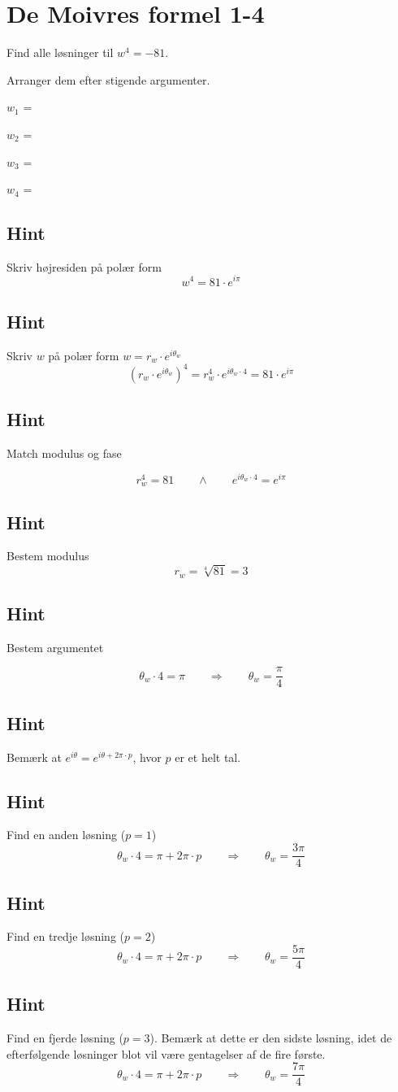 \documentclass{article}
\newenvironment{exercise}[1]{\newpage\section{#1}}{}
\newcommand{\answerbox}[1]{\fbox{$#1$}}
\newcommand{\hint}{\subsection*{Hint}}
\begin{document}
\begin{exercise}{De Moivres formel 1-4}

Find alle løsninger til $w^4=-81$. 

Arranger dem efter stigende argumenter.

$w_1$ = \answerbox{3 \cdot e^{i \frac{\pi}{4}}}		

$w_2$ = \answerbox{3 \cdot e^{i \frac{3 \pi}{4}}}		

$w_3$ = \answerbox{3 \cdot e^{i \frac{5 \pi}{4}}}		

$w_4$ = \answerbox{3 \cdot e^{i \frac{7 \pi}{4}}}	 


\hint 

Skriv højresiden på polær form
\[
w^4 = 81 \cdot e^{i \pi}
\]


\hint

Skriv $w$ på polær form $w = r_w \cdot e^{i \theta_w}$
\[
\left(r_w \cdot e^{i \theta_w}\right)^4 = r_w^4 \cdot e^{i \theta_w \cdot 4} = 81 \cdot e^{i \pi}
\]

\hint 
Match modulus og fase

\[
r_w^4 = 81 \qquad \wedge \qquad e^{i \theta_w \cdot 4} = e^{i \pi}
\]

\hint

Bestem modulus
\[
r_w  =  \sqrt[4]{81} = 3
\]

\hint

Bestem argumentet

\[
\theta_w \cdot 4 = \pi \qquad \Rightarrow \qquad  \theta_w = \frac{\pi}{4}
\]

\hint

Bemærk at $e^{i \theta} = e^{i \theta + 2 \pi \cdot p}$, hvor $p$ er et helt tal.

\hint

Find en anden løsning ($p=1$)
\[
\theta_w \cdot 4 = \pi  + 2 \pi \cdot p \qquad \Rightarrow \qquad  \theta_w = \frac{3 \pi}{4}
\]

\hint

Find en tredje løsning ($p=2$)
\[
\theta_w \cdot 4 = \pi  + 2 \pi \cdot p \qquad \Rightarrow  \qquad  \theta_w = \frac{5 \pi}{4}
\]

\hint

Find en fjerde løsning ($p=3$). 
Bemærk at dette er den sidste løsning, idet de efterfølgende 
løsninger blot vil være gentagelser af de fire første. 
\[
\theta_w \cdot 4 = \pi  + 2 \pi \cdot p \qquad \Rightarrow  \qquad  \theta_w = \frac{7 \pi}{4}
\]

\end{exercise}
\end{document}
